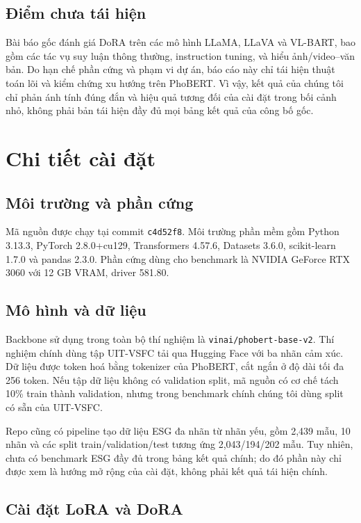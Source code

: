 \documentclass{article}
\theoremstyle{plain}
\theoremstyle{definition}
\begin{document}
\subsection{Điểm chưa tái hiện}

Bài báo gốc đánh giá DoRA trên các mô hình LLaMA, LLaVA và VL-BART, bao gồm các tác vụ suy luận thông thường, instruction tuning, và hiểu ảnh/video--văn bản. Do hạn chế phần cứng và phạm vi dự án, báo cáo này chỉ tái hiện thuật toán lõi và kiểm chứng xu hướng trên PhoBERT. Vì vậy, kết quả của chúng tôi chỉ phản ánh tính đúng đắn và hiệu quả tương đối của cài đặt trong bối cảnh nhỏ, không phải bản tái hiện đầy đủ mọi bảng kết quả của công bố gốc.

\section{Chi tiết cài đặt}

\subsection{Môi trường và phần cứng}

Mã nguồn được chạy tại commit \texttt{c4d52f8}. Môi trường phần mềm gồm Python 3.13.3, PyTorch 2.8.0+cu129, Transformers 4.57.6, Datasets 3.6.0, scikit-learn 1.7.0 và pandas 2.3.0. Phần cứng dùng cho benchmark là NVIDIA GeForce RTX 3060 với 12 GB VRAM, driver 581.80.

\subsection{Mô hình và dữ liệu}

Backbone sử dụng trong toàn bộ thí nghiệm là \texttt{vinai/phobert-base-v2}. Thí nghiệm chính dùng tập UIT-VSFC tải qua Hugging Face với ba nhãn cảm xúc. Dữ liệu được token hoá bằng tokenizer của PhoBERT, cắt ngắn ở độ dài tối đa 256 token. Nếu tập dữ liệu không có validation split, mã nguồn có cơ chế tách 10\% train thành validation, nhưng trong benchmark chính chúng tôi dùng split có sẵn của UIT-VSFC.

Repo cũng có pipeline tạo dữ liệu ESG đa nhãn từ nhãn yếu, gồm 2,439 mẫu, 10 nhãn và các split train/validation/test tương ứng 2,043/194/202 mẫu. Tuy nhiên, chưa có benchmark ESG đầy đủ trong bảng kết quả chính; do đó phần này chỉ được xem là hướng mở rộng của cài đặt, không phải kết quả tái hiện chính.

\subsection{Cài đặt LoRA và DoRA}
\end{document}
